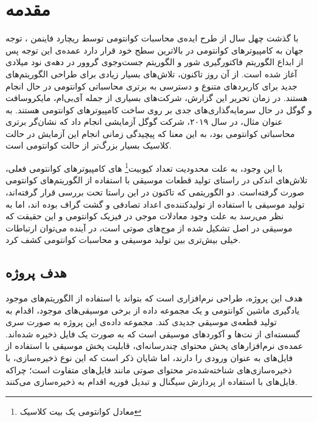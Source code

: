 
\chapter{مقدمه}


با گذشت چهل سال از طرح ایده‌ی محاسبات کوانتومی توسط ریچارد فاینمن
\cite{feynman}،
توجه جهان به کامپیوترهای کوانتومی در بالاترین سطح خود قرار دارد
عمده‌ی این توجه پس از ابداع الگوریتم فاکتورگیری شور
و الگوریتم جست‌وجوی گروور 
در دهه‌ی نود میلادی آغاز شده است. از آن روز تاکنون، تلاش‌های بسیار زیادی برای طراحی الگوریتم‌های جدید برای کاربردهای متنوع و دسترسی به برتری محاسباتی کوانتومی در حال انجام هستند. در زمان تحریر این گزارش، شرکت‌های بسیاری از جمله آی‌بی‌ام، مایکروسافت و گوگل در حال سرمایه‌گذاری‌های جدی بر روی ساخت کامپیوترهای کوانتومی هستند. به عنوان مثال، در سال ۲۰۱۹،
شرکت گوگل آزمایشی 
\cite{google_supremacy}
انجام داد که نشان‌گر برتری محاسباتی کوانتومی بود، به این معنا که پیچیدگی زمانی انجام این آزمایش در حالت کلاسیک بسیار بزرگ‌تر از حالت کوانتومی است.

با این وجود، به علت محدودیت تعداد کیوبیت\footnote{معادل کوانتومی یک بیت کلاسیک}
های کامپیوترهای کوانتومی فعلی، تلاش‌های اندکی در راستای تولید قطعات موسیقی با استفاده از الگوریتم‌های کوانتومی صورت گرفته‌است. دو الگوریتمی که تاکنون در این راستا تحت بررسی قرار گرفته‌اند، تولید موسیقی با استفاده از تولیدکننده‌ی اعداد تصادفی
و گشت گراف 
\cite{miranda}
بوده اند، اما به نظر می‌رسد به علت وجود معادلات موجی در فیزیک کوانتومی و این حقیقت که موسیقی در اصل تشکیل شده از موج‌های صوتی است، در آینده می‌توان ارتباطات خیلی بیش‌تری بین تولید موسیقی و محاسبات کوانتومی کشف کرد.

\newpage
\section{هدف پروژه}
هدف این پروژه، طراحی نرم‌افزاری است که بتواند با استفاده از الگوریتم‌های موجود یادگیری ماشین کوانتومی و یک  مجموعه داده از برخی موسیقی‌های موجود، اقدام به تولید قطعه‌ی موسیقی
جدیدی کند.
مجموعه داده‌ی این پروژه به صورت سری گسسته‌ای از نت‌ها و آکوردهای موسیقی است که به صورت یک فایل 
ذخیره شده‌اند.
عمده‌ی نرم‌افزارهای پخش محتوای چندرسانه‌ای، قابلیت پخش موسیقی با استفاده از فایل‌های 
به عنوان ورودی را دارند، اما
 شایان ذکر است که این نوع ذخیره‌سازی، با ذخیره‌سازی‌های شناخته‌شده‌تر محتوای صوتی مانند فایل‌های 
 متفاوت است؛ چراکه فایل‌های
 با استفاده از پردازش سیگنال و تبدیل فوریه اقدام به ذخیره‌سازی می‌کنند.
 

